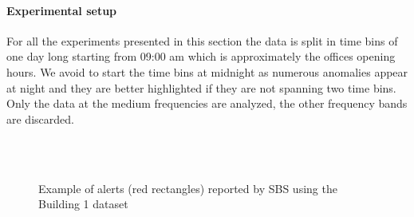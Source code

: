\paragraph{Experimental setup}
For all the experiments presented in this section the data is split in time bins of one day long starting from 09:00 am which is approximately the offices opening hours.
We avoid to start the time bins at midnight as numerous anomalies appear at night and they are better highlighted if they are not spanning two time bins.
Only the data at the medium frequencies are analyzed, the other frequency bands are discarded.

\begin{figure}[t]
   \hspace{.015\textwidth} %
   \hspace{.015\textwidth}  %
 \\ %
 \\  
\caption{Example of alerts (red rectangles) reported by SBS using the Building 1 dataset}
\end{figure}


